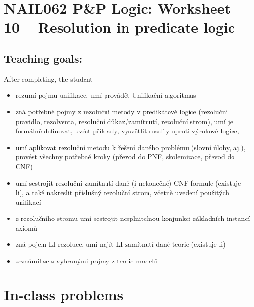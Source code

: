 \section*{NAIL062 P\&P Logic: Worksheet 10 -- Resolution in predicate logic}


\subsection*{Teaching goals:} After completing, the student

    \begin{itemize}\setlength{\itemsep}{0pt}
        \item rozumí pojmu unifikace, umí provádět Unifikační algoritmus
        \item zná potřebné pojmy z rezoluční metody v predikátové logice (rezoluční pravidlo, rezolventa, rezoluční důkaz/zamítnutí, rezoluční strom), umí je formálně definovat, uvést příklady, vysvětlit rozdíly oproti výrokové logice, 
        \item umí aplikovat rezoluční metodu k řešení daného problému (slovní úlohy, aj.), provést všechny potřebné kroky (převod do PNF, skolemizace, převod do CNF)
        \item umí sestrojit rezoluční zamítnutí dané (i nekonečné) CNF formule (existuje-li), a také nakreslit příslušný rezoluční strom, včetně uvedení použitých unifikací
        \item z rezolučního stromu umí sestrojit nesplnitelnou konjunkci základních instancí axiomů
        \item zná pojem LI-rezoluce, umí najít LI-zamítnutí dané teorie (existuje-li)
        \item seznámil se s vybranými pojmy z teorie modelů
    \end{itemize}
    

\section*{In-class problems}


